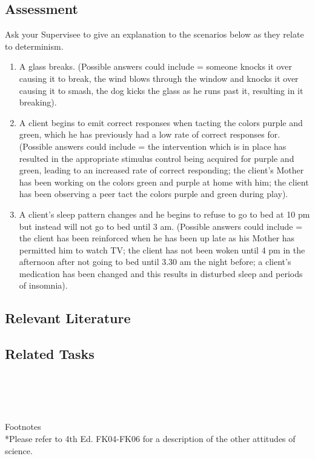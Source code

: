 \subsection{Assessment}
Ask your Supervisee to give an explanation to the scenarios below as they relate to determinism.
\begin{enumerate}
\item A glass breaks. (Possible answers could include = someone knocks it over causing it to break, the wind blows through the window and knocks it over causing it to smash, the dog kicks the glass as he runs past it, resulting in it breaking).
\item A client begins to emit correct responses when tacting the colors purple and green, which he has previously had a low rate of correct responses for. (Possible answers could include = the intervention which is in place has resulted in the appropriate stimulus control being acquired for purple and green, leading to an increased rate of correct responding; the client's Mother has been working on the colors green and purple at home with him; the client has been observing a peer tact the colors purple and green during play).
\item A client's sleep pattern changes and he begins to refuse to go to bed at 10 pm but instead will not go to bed until 3 am. (Possible answers could include = the client has been reinforced when he has been up late as his Mother has permitted him to watch TV; the client has not been woken until 4 pm in the afternoon after not going to bed until 3.30 am the night before; a client's medication has been changed and this results in disturbed sleep and periods of insomnia). 
\end{enumerate}
%
\subsection{Relevant Literature}
\begin{refsection}
\nocite{cooper2007applied,
        delprato1992some,
        fisher2014handbook}
\printbibliography[heading=none]
\end{refsection}
%
\subsection{Related Tasks}
\fourFKOne{}\\
\fourFKFour{}\\
\fourFKFive{}\\
\fourFKSix{}\\

Footnotes\\
*Please refer to 4th Ed. FK04-FK06 for a description of the other attitudes of science.\\
